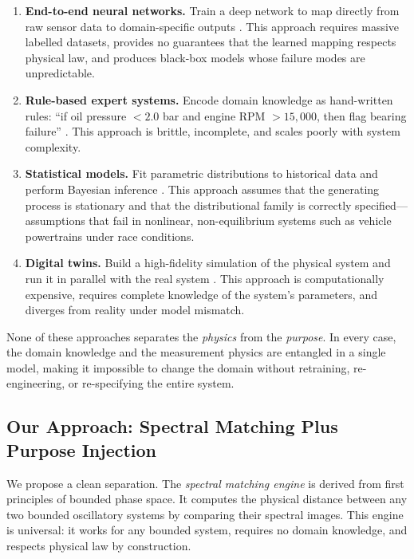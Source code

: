 \documentclass[11pt,twocolumn,a4paper]{article}
\theoremstyle{definition}
\theoremstyle{remark}
\begin{document}
\begin{enumerate}[label=(\roman*)]
    \item \textbf{End-to-end neural networks.}  Train a deep network to map directly from raw sensor data to domain-specific outputs \citep{vaswani2017attention}.  This approach requires massive labelled datasets, provides no guarantees that the learned mapping respects physical law, and produces black-box models whose failure modes are unpredictable.

    \item \textbf{Rule-based expert systems.}  Encode domain knowledge as hand-written rules: ``if oil pressure $< 2.0$ bar and engine RPM $> 15{,}000$, then flag bearing failure'' \citep{kirchhoff1845ueber}.  This approach is brittle, incomplete, and scales poorly with system complexity.

    \item \textbf{Statistical models.}  Fit parametric distributions to historical data and perform Bayesian inference \citep{jaynes1957information}.  This approach assumes that the generating process is stationary and that the distributional family is correctly specified---assumptions that fail in nonlinear, non-equilibrium systems such as vehicle powertrains under race conditions.

    \item \textbf{Digital twins.}  Build a high-fidelity simulation of the physical system and run it in parallel with the real system \citep{landau1980statistical}.  This approach is computationally expensive, requires complete knowledge of the system's parameters, and diverges from reality under model mismatch.
\end{enumerate}

None of these approaches separates the \emph{physics} from the \emph{purpose}.  In every case, the domain knowledge and the measurement physics are entangled in a single model, making it impossible to change the domain without retraining, re-engineering, or re-specifying the entire system.

\subsection{Our Approach: Spectral Matching Plus Purpose Injection}

We propose a clean separation.  The \emph{spectral matching engine} is derived from first principles of bounded phase space.  It computes the physical distance between any two bounded oscillatory systems by comparing their spectral images.  This engine is universal: it works for any bounded system, requires no domain knowledge, and respects physical law by construction.
\end{document}
